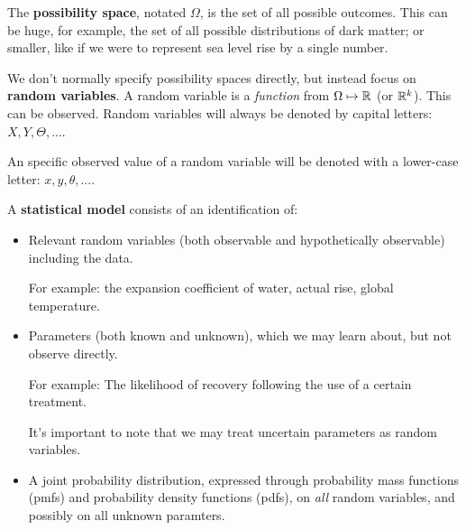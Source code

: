 \documentclass[a4paper]{article}
\begin{document}
            \begin{definition}
                The \textbf{possibility space}, notated $\Omega$, is the set of
                all possible outcomes. This can be huge, for example, the set of
                all possible distributions of dark matter; or smaller, like if
                we were to represent sea level rise by a single number.

                We don't normally specify possibility spaces directly, but
                instead focus on \textbf{random variables}. A random variable is
                a \textit{function} from $\Omega \mapsto \mathbb{R}$ (or $\mathbb{R}^k$). This
                can be observed. Random variables will always be denoted by
                capital letters: $X, Y, \Theta, ...$.

                An specific observed value of a random variable will be denoted
                with a lower-case letter: $x, y, \theta, ...$.

                A \textbf{statistical model} consists of an identification of:

                \begin{itemize}
                    \item Relevant random variables (both observable and
                        hypothetically observable) including the data.

                        For example: the expansion coefficient of water, actual
                        rise, global temperature.

                    \item Parameters (both known and unknown), which we may
                        learn about, but not observe directly.

                        For example: The likelihood of recovery following the
                        use of a certain treatment.

                        It's important to note that we may treat uncertain
                        parameters as random variables.

                    \item A joint probability distribution, expressed through
                        probability mass functions (pmfs) and probability
                        density functions (pdfs), on \textit{all} random
                        variables, and possibly on all unknown paramters.
                \end{itemize}
            \end{definition}
\end{document}
